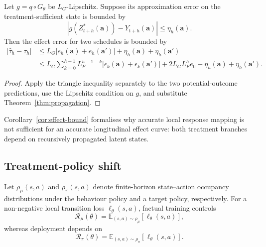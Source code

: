 \begin{corollary}
\label{cor:effect-bound}
Let $g=q\circ G_\theta$ be $L_G$-Lipschitz. Suppose its approximation
error on the treatment-sufficient state is bounded by
\begin{equation}
    |g(Z^*_{t+h}(\bm a))-Y_{t+h}(\bm a)|
    \leq\eta_h(\bm a).
    \label{eq:decoder-residual}
\end{equation}
Then the effect error for two schedules is bounded by
\begin{align}
|\widehat\tau_h-\tau_h|
&\leq
L_G\bigl[e_h(\bm a)+e_h(\bm a')\bigr]
+\eta_h(\bm a)+\eta_h(\bm a')
\label{eq:effect-latent-bound}\\
&\leq
L_G\!\sum_{k=0}^{h-1}L_F^{h-1-k}
\bigl[\epsilon_k(\bm a)+\epsilon_k(\bm a')\bigr]
+2L_GL_F^h e_0
+\eta_h(\bm a)+\eta_h(\bm a').
\label{eq:effect-transition-bound}
\end{align}
\end{corollary}

\begin{proof}
Apply the triangle inequality separately to the two potential-outcome
predictions, use the Lipschitz condition on $g$, and substitute
Theorem~\ref{thm:propagation}.
\end{proof}

Corollary~\ref{cor:effect-bound} formalises why accurate local response
mapping is not sufficient for an accurate longitudinal effect curve:
both treatment branches depend on recursively propagated latent states.

\subsection{Treatment-policy shift}

Let $\rho_\mu(s,a)$ and $\rho_\pi(s,a)$ denote finite-horizon
state--action occupancy distributions under the behaviour policy and a
target policy, respectively. For a non-negative local transition loss
$\ell_\theta(s,a)$, factual training controls
\begin{equation}
    \mathcal R_\mu(\theta)
    =\mathbb E_{(s,a)\sim\rho_\mu}[\ell_\theta(s,a)],
    \label{eq:behavior-risk}
\end{equation}
whereas deployment depends on
\begin{equation}
    \mathcal R_\pi(\theta)
    =\mathbb E_{(s,a)\sim\rho_\pi}[\ell_\theta(s,a)].
    \label{eq:target-risk}
\end{equation}

